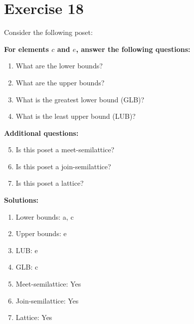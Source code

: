 \documentclass{article}
\begin{document}
\section*{Exercise 18}
Consider the following poset:
\begin{center}
\end{center}

    \textbf{For elements $c$ and $e$, answer the following questions:}
\begin{enumerate}
    \item What are the lower bounds?
    \item What are the upper bounds?
    \item What is the greatest lower bound (GLB)?
    \item What is the least upper bound (LUB)?
\end{enumerate}
    \hspace*{3ex} \textbf{Additional questions:}
\begin{enumerate}
    \setcounter{enumi}{4}
    \item Is this poset a meet-semilattice?
    \item Is this poset a join-semilattice?
    \item Is this poset a lattice?
\end{enumerate}

\textbf{Solutions:}
\begin{enumerate}
    \item Lower bounds: {a, c}
    \item Upper bounds: {e}
    \item LUB: e
    \item GLB: c
    \item Meet-semilattice: Yes
    \item Join-semilattice: Yes
    \item Lattice: Yes
\end{enumerate}
\newpage
\end{document}
